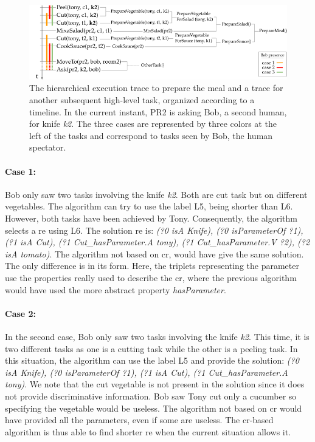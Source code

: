 \begin{figure}[ht!]
\centering
\includegraphics[width=\textwidth]{figures/chapter7/prepare_meal_plan.png}
\caption{\label{fig:chap7_meal_plan} The hierarchical execution trace to prepare the meal and a trace for another subsequent high-level task, organized according to a timeline. In the current instant, PR2 is asking Bob, a second human, for knife \textit{k2}. The three cases are represented by three colors at the left of the tasks and correspond to tasks seen by Bob, the human spectator.}
\end{figure}

\paragraph{Case 1:} Bob only saw two tasks involving the knife \textit{k2}. Both are cut task but on different vegetables. The algorithm can try to use the label L5, being shorter than L6. However, both tasks have been achieved by Tony. Consequently, the algorithm selects a \acrshort{re} using L6. The solution \acrshort{re} is: \textit{(?0 isA Knife), (?0 isParameterOf ?1), (?1 isA Cut), (?1 Cut\_hasParameter.A tony), (?1 Cut\_hasParameter.V ?2), (?2 isA tomato)}. The algorithm not based on \acrshort{cr}, would have give the same solution. The only difference is in its form. Here, the triplets representing the parameter use the properties really used to describe the \acrshort{cr}, where the previous algorithm would have used the more abstract property \textit{hasParameter}.

\paragraph{Case 2:} In the second case, Bob only saw two tasks involving the knife \textit{k2}. This time, it is two different tasks as one is a cutting task while the other is a peeling task. In this situation, the algorithm can use the label L5 and provide the solution: \textit{(?0 isA Knife), (?0 isParameterOf ?1), (?1 isA Cut), (?1 Cut\_hasParameter.A tony)}. We note that the cut vegetable is not present in the solution since it does not provide discriminative information. Bob saw Tony cut only a cucumber so specifying the vegetable would be useless. The algorithm not based on \acrshort{cr} would have provided all the parameters, even if some are useless. The \acrshort{cr}-based algorithm is thus able to find shorter \acrshort{re} when the current situation allows it.

